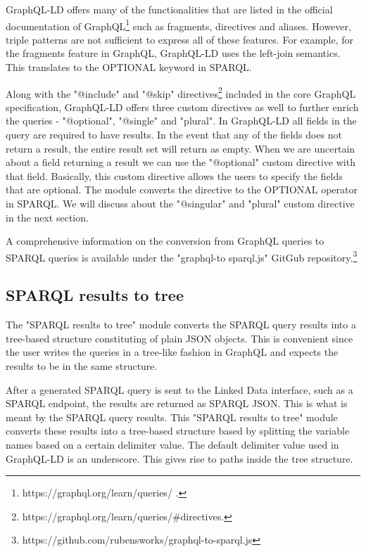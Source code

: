 GraphQL-LD offers many of the functionalities that are listed in the official documentation of GraphQL\footnote{https://graphql.org/learn/queries/ .} such as fragments, directives and aliases. However, triple patterns are not sufficient to express all of these features\cite{Taelman2018}. For example, for the fragments feature in GraphQL, GraphQL-LD uses the left-join semantics. This translates to the OPTIONAL keyword in SPARQL.

Along with the "@include" and "@skip" directives\footnote{https://graphql.org/learn/queries/\#directives.} included in the core GraphQL specification, GraphQL-LD offers three custom directives as well to further enrich the queries - "@optional", "@single" and "plural". In GraphQL-LD all fields in the query are required to have results. In the event that any of the fields does not return a result, the entire result set will return as empty. When we are uncertain about a field returning a result we can use the "@optional" custom directive with that field. Basically, this custom directive allows the users to specify the fields that are optional. The module converts the directive to the OPTIONAL operator in SPARQL. We will discuss about the "@singular" and "plural" custom directive in the next section.

A comprehensive information on the conversion from GraphQL queries to SPARQL queries is available under the "graphql-to sparql.js" GitGub repository.\footnote{https://github.com/rubensworks/graphql-to-sparql.js}

\subsection{SPARQL results to tree}

The "SPARQL results to tree" module converts the SPARQL query results into a tree-based structure constituting of plain JSON objects. This is convenient since the user writes the queries in a tree-like fashion in GraphQL and expects the results to be in the same structure.

After a generated SPARQL query is sent to the Linked Data interface, such as a SPARQL endpoint, the results are returned as SPARQL JSON. This is what is meant by the SPARQL query results. This "SPARQL results to tree" module converts these results into a tree-based structure based by splitting the variable names based on a certain delimiter value. The default delimiter value used in GraphQL-LD is an underscore. This gives rise to paths inside the tree structure.

